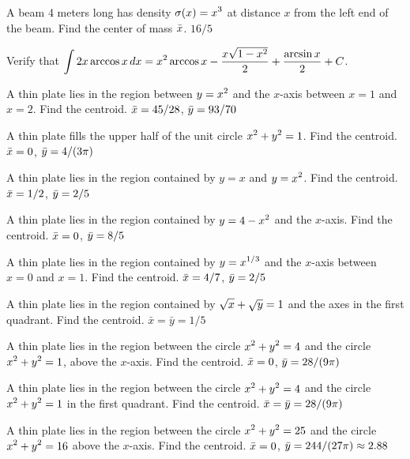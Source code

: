 \exercise A beam 4 meters long has density $\displaystyle \sigma(x)=x^3$ at
distance $x$ from the left end of the beam. Find the center of mass
$\displaystyle \bar x$.
\answer $16/5$
\endanswer
\endexercise

\exercise Verify that $\displaystyle\int 2x\arccos x\,dx=
x^2\arccos x-{x\sqrt{1-x^2}\over2}+{\arcsin x\over 2}+C$.
\endexercise

\exercise A thin plate lies in the region between $\displaystyle y=x^2$ and the $x$-axis
between $x=1$ and $x=2$. Find the centroid.
\answer $\displaystyle \bar x=45/28$, $\displaystyle \bar y = 93/70$
\endanswer
\endexercise

\exercise A thin plate fills the upper half of the unit circle
$\displaystyle x^2+y^2=1$. Find the centroid.
\answer $\displaystyle \bar x=0$, $\displaystyle \bar y=4/(3\pi)$
\endanswer
\endexercise

\exercise A thin plate lies in the region contained by $y=x$ and
$\displaystyle y=x^2$. Find the centroid.
\answer $\displaystyle \bar x=1/2$, $\displaystyle \bar y=2/5$
\endanswer
\endexercise

\exercise A thin plate lies in the region contained by $\displaystyle y=4-x^2$ and
the $x$-axis. Find the centroid.
\answer $\displaystyle \bar x=0$, $\displaystyle \bar y=8/5$
\endanswer
\endexercise

\exercise A thin plate lies in the region contained by $\displaystyle y=x^{1/3}$ and
the $x$-axis between $x=0$ and $x=1$. Find the centroid.
\answer $\displaystyle \bar x=4/7$, $\displaystyle \bar y=2/5$
\endanswer
\endexercise

\exercise A thin plate lies in the region contained by 
$\displaystyle \sqrt{x}+\sqrt{y}=1$ and the axes in the first quadrant.
Find the centroid.
\answer $\bar x=\bar y=1/5$
\endanswer
\endexercise

\exercise A thin plate lies in the region between
the circle $\displaystyle x^2+y^2=4$ and the circle $\displaystyle x^2+y^2=1$, above the $x$-axis.
Find the centroid.
\answer $\displaystyle \bar x=0$, $\displaystyle \bar y=28/(9\pi)$
\endanswer
\endexercise

\exercise A thin plate lies in the region between 
the circle $\displaystyle x^2+y^2=4$ and the circle $\displaystyle x^2+y^2=1$ in the first quadrant.
Find the centroid.
\answer $\displaystyle \bar x=\bar y=28/(9\pi)$
\endanswer
\endexercise

\exercise A thin plate lies in the region between 
the circle $\displaystyle x^2+y^2=25$ and the circle $\displaystyle x^2+y^2=16$
above the $x$-axis.
Find the centroid.
\answer $\displaystyle \bar x=0$, $\displaystyle\bar y=244/(27\pi)\approx 2.88$
\endanswer
\endexercise

\endexercises
